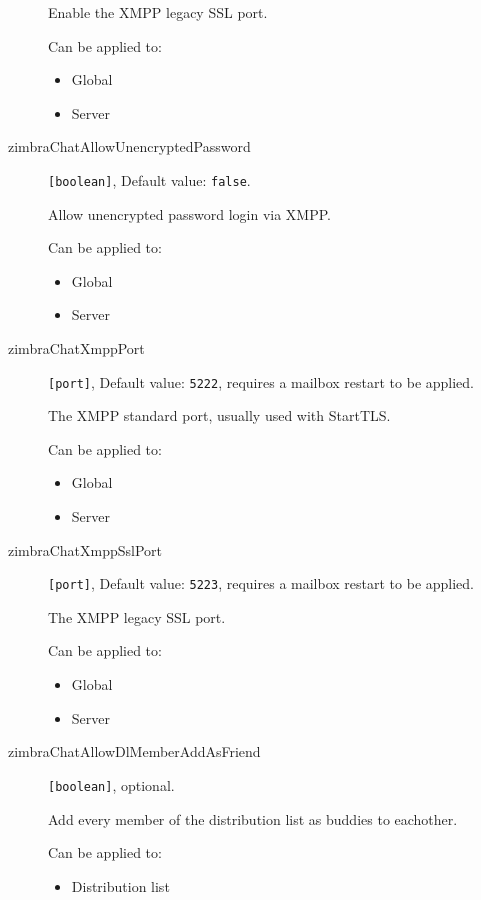 \begin{description}
Enable the XMPP legacy SSL port.

Can be applied to:
\begin{itemize}
    \item Global
    \item Server
\end{itemize}

\item [zimbraChatAllowUnencryptedPassword] \verb+[boolean]+, Default value: \verb+false+.

Allow unencrypted password login via XMPP.

Can be applied to:
\begin{itemize}
    \item Global
    \item Server
\end{itemize}

\item [zimbraChatXmppPort] \verb+[port]+, Default value: \verb+5222+, requires a mailbox restart to be applied.

The XMPP standard port, usually used with StartTLS.

Can be applied to:
\begin{itemize}
    \item Global
    \item Server
\end{itemize}

\item [zimbraChatXmppSslPort] \verb+[port]+, Default value: \verb+5223+, requires a mailbox restart to be applied.

The XMPP legacy SSL port.

Can be applied to:
\begin{itemize}
    \item Global
    \item Server
\end{itemize}

\item [zimbraChatAllowDlMemberAddAsFriend] \verb+[boolean]+, optional.

Add every member of the distribution list as buddies to eachother.

Can be applied to:
\begin{itemize}
    \item Distribution list
\end{itemize}

\end{description}
